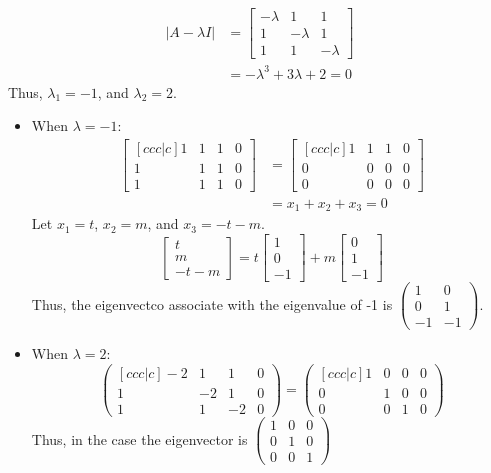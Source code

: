 \documentclass[11pt]{article} %
\begin{document}
\begin{align*}
	|A-\lambda I|&=\begin{bmatrix}
		-\lambda & 1&1\\
		1&-\lambda&1\\
		1&1&-\lambda
	\end{bmatrix}\\
&=-\lambda^3+3\lambda+2=0
\end{align*}
Thus, $\lambda_1=-1$, and $\lambda_2=2$. 
\begin{itemize}
	\item When $\lambda=-1$:
	\begin{align*}
		\begin{bmatrix}[ccc|c]
			1&1&1&0\\
			1&1&1&0\\
			1&1&1&0
		\end{bmatrix}&=\begin{bmatrix}[ccc|c]
		1&1&1&0\\
		0&0&0&0\\
		0&0&0&0
	\end{bmatrix}\\
&=x_1+x_2+x_3=0
	\end{align*}
Let $x_1=t$, $x_2=m$, and $x_3=-t-m$. 
$$\begin{bmatrix}
	t\\
	m\\
	-t-m
\end{bmatrix}=t\begin{bmatrix}
1\\0\\-1
\end{bmatrix}+m\begin{bmatrix}
0\\1\\-1
\end{bmatrix}$$
Thus, the eigenvectco associate with the eigenvalue of -1 is $\begin{pmatrix}
	1&0\\
	0&1\\
	-1&-1
\end{pmatrix}$.
\item When $\lambda=2:$
$$\begin{pmatrix}[ccc|c]
	-2&1&1&0\\
	1&-2&1&0\\
	1&1&-2&0
\end{pmatrix}=\begin{pmatrix}[ccc|c]
1&0&0&0\\
0&1&0&0\\
0&0&1&0
\end{pmatrix}$$
Thus, in the case the eigenvector is $\begin{pmatrix}
	1&0&0\\
	0&1&0\\
	0&0&1
\end{pmatrix}$

\end{itemize}
\end{document}
